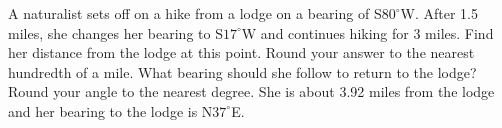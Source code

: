 { A naturalist sets off on a hike from a lodge on a bearing of S$80^{\circ}$W.  After 1.5 miles, she changes her bearing to S$17^{\circ}$W and continues hiking for 3 miles.  Find her distance from the lodge at this point.  Round your answer to the nearest hundredth of a mile.  What bearing should she follow to return to the lodge?  Round your angle to the nearest degree.}
{ She is about 3.92 miles from the lodge and her bearing to the lodge is N$37^{\circ}$E. }
